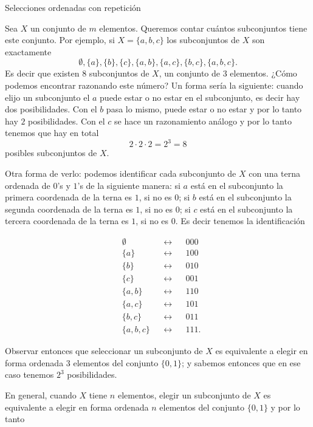 \begin{section}{Selecciones ordenadas con repetición}
 

\begin{ejemplo} Sea $X$ un conjunto de $m$ elementos. Queremos contar cuántos subconjuntos tiene este conjunto. 
Por ejemplo, si $X = \{ a, b, c \}$ los subconjuntos de $X$ son exactamente
$$
\emptyset, \{ a \} , \{ b \}, \{ c \}, \{ a, b \}, \{ a, c \}, \{ b, c \}, \{ a, b, c\}.
$$ 
Es decir que existen $8$ subconjuntos de $X$, un conjunto de $3$ elementos. ¿Cómo podemos encontrar razonando este número? Un forma sería la siguiente:  cuando elijo un subconjunto el $a$ puede estar o no estar en el subconjunto, es decir hay dos posibilidades. Con el $b$ pasa lo mismo, puede estar o no estar y por lo tanto hay $2$ posibilidades. Con el $c$ se hace un razonamiento análogo y por lo tanto tenemos que hay en total 
$$
2 \cdot 2 \cdot 2 = 2^3 = 8
$$
posibles subconjuntos de $X$.  

Otra forma de verlo: podemos identificar  cada subconjunto de  $X$ con una terna ordenada de $0$'s y $1$'s de la siguiente manera: si $a$ está en el subconjunto la primera coordenada de la terna es $1$, si no es $0$;  si $b$ está en el subconjunto la segunda coordenada de la terna es $1$, si no es $0$;  si $c$ está en el subconjunto la tercera coordenada de la terna es $1$, si no es $0$. Es decir tenemos la identificación



\begin{align*}
&\emptyset& &\leftrightarrow& &000 \\ 
&\{ a \} & &\leftrightarrow& &100 \\ 
&\{ b \}& &\leftrightarrow& &010 \\ 
&\{ c \}& &\leftrightarrow& &001 \\ 
&\{ a, b \}& &\leftrightarrow& &110 \\ 
&\{ a, c \}& &\leftrightarrow& &101 \\ 
&\{ b, c \}& &\leftrightarrow& &011 \\ 
&\{ a, b, c\}& &\leftrightarrow& &111 .
\end{align*}
 
Observar entonces que seleccionar un subconjunto de $X$ es equivalente a elegir en forma ordenada $3$ elementos del conjunto $\{ 0, 1 \}$; y sabemos entonces que en ese caso tenemos $2^3$ posibilidades. 

En general, cuando $X$ tiene $n$ elementos, 
elegir un subconjunto de $X$ es  equivalente a elegir en forma 
ordenada $n$ elementos del conjunto $\{ 0, 1 \}$ y por lo tanto


\end{ejemplo}
\end{section}
